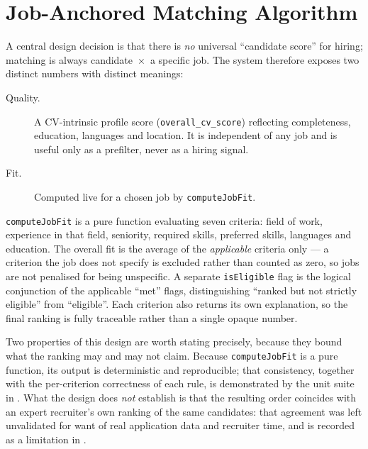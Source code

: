
\section{Job-Anchored Matching Algorithm}
\label{sec:design-matching}

A central design decision is that there is \emph{no} universal
``candidate score'' for hiring; matching is always candidate~$\times$~a
specific job. The system therefore exposes two distinct numbers with
distinct meanings:

\begin{description}
	\item[Quality.] A CV-intrinsic profile score
	(\texttt{overall\_cv\_score}) reflecting completeness, education,
	languages and location. It is independent of any job and is useful only
	as a prefilter, never as a hiring signal.
	\item[Fit.] Computed live for a chosen job by \texttt{computeJobFit}.
\end{description}

\texttt{computeJobFit} is a pure function evaluating seven criteria: field
of work, experience in that field, seniority, required skills, preferred
skills, languages and education. The overall fit is the average of the
\emph{applicable} criteria only --- a criterion the job does not specify is
excluded rather than counted as zero, so jobs are not penalised for being
unspecific. A separate \texttt{isEligible} flag is the logical conjunction
of the applicable ``met'' flags, distinguishing ``ranked but not strictly
eligible'' from ``eligible''. Each criterion also returns its own explanation,
so the final ranking is fully traceable rather than a single opaque number.

Two properties of this design are worth stating precisely, because they bound
what the ranking may and may not claim. Because \texttt{computeJobFit} is a
pure function, its output is deterministic and reproducible; that consistency,
together with the per-criterion correctness of each rule, is demonstrated by
the unit suite in . What the design does \emph{not}
establish is that the resulting order coincides with an expert recruiter's own
ranking of the same candidates: that agreement was left unvalidated for want of
real application data and recruiter time, and is recorded as a
limitation in .

